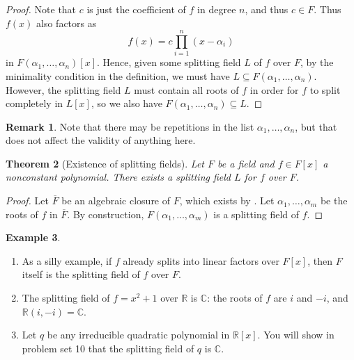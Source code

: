 \documentclass[12pt]{report}
\newtheorem{theorem}{Theorem}[chapter]
\numberwithin{equation}{section}
\numberwithin{theorem}{chapter}
\theoremstyle{definition}
\newtheorem{example}[theorem]{Example}
\newtheorem*{basic properties}{Basic Properties}
\newtheorem*{Important Remark}{Important Remark}
\newtheorem{remark}[theorem]{Remark}
\newcommand{\C}{\mathbb{C}}
\begin{document}
\begin{proof}
Note that $c$ is just the coefficient of $f$ in degree $n$, and thus $c \in F$. Thus $f(x)$ also factors as 
$$f(x) = c \prod_{i=1}^n (x - \alpha_i)$$ 
in $F(\alpha_1,\ldots,\alpha_n)[x]$. Hence, given some splitting field $L$ of $f$ over $F$, by the minimality condition in the definition, we must have $L \subseteq F(\alpha_1,\dots, \alpha_n)$. However, the splitting field $L$ must contain all roots of $f$ in order for $f$ to split completely in $L[x]$, so we also have $F(\alpha_1,\dots, \alpha_n) \subseteq L$.
\end{proof}


\begin{remark}
	Note that there may be repetitions in the list $\alpha_1,\ldots, \alpha_n$, but that does not affect the validity of anything here.
\end{remark}

%

\begin{theorem}[Existence of splitting fields]\label{existence of splitting fields}
Let $F$ be a field and $f \in F[x]$ a nonconstant polynomial. There exists a splitting field $L$ for $f$ over $F$.
\end{theorem}

\begin{proof} 
Let $\overline{F}$ be an algebraic closure of $F$, which exists by . Let $\alpha_1, \ldots, \alpha_m$ be the roots of $f$ in $\overline{F}$. By construction, $F(\alpha_1, \ldots, \alpha_m)$ is a splitting field of $f$.
\end{proof}




\begin{example}$\,$
\begin{enumerate}[label=\alph*),leftmargin=15pt]
\item As a silly example, if $f$ already splits into linear factors over $F[x]$, then $F$ itself is the splitting field of $f$ over $F$.
\item The splitting field of $f = x^2 + 1$ over $\mathbb{R}$ is $\C$: the roots of $f$ are $i$ and $-i$, and $\mathbb{R}(i,-i) = \C$.
\item Let $q$ be any irreducible quadratic polynomial in $\mathbb{R}[x]$. You will show in problem set 10 that the splitting field of $q$ is $\C$.
\end{enumerate}
\end{example}
\end{document}
